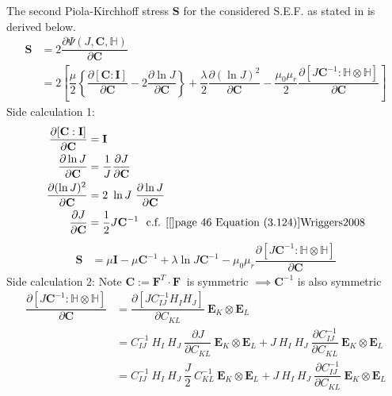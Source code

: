 \documentclass[11pt,a4paper,final]{article}
\begin{document}
The second Piola-Kirchhoff stress $\mathbf{S}$ for the considered S.E.F. as stated in  is derived below.
\begin{align*}
\mathbf{S} &= 2 \dfrac{\partial \Psi (J, \mathbf{C}, \mathbb{H})}{\partial \mathbf{C}} \\
&= 2 \left[ \dfrac{\mu}{2} \left\lbrace \dfrac{\partial [\mathbf{C} : \mathbf{I}]}{\partial \mathbf{C}} - 2 \dfrac{\partial \ln J}{\partial \mathbf{C}} \right\rbrace + \dfrac{\lambda}{2} \dfrac{\partial (\ln J)^2}{\partial \mathbf{C}} - \dfrac{\mu_0 \mu_r}{2} \dfrac{\partial [J \mathbf{C}^{-1} : \mathbb{H} \otimes \mathbb{H}]}{\partial \mathbf{C}} \right]
\end{align*}
Side calculation 1:
\begin{align*}
\dfrac{\partial [\mathbf{C} : \mathbf{I}]}{\partial \mathbf{C}} &= \mathbf{I} \\ 
\dfrac{\partial \ln J}{\partial \mathbf{C}} &= \dfrac{1}{J} \dfrac{\partial J}{\partial \mathbf{C}} \\
\dfrac{\partial (\ln J)^2}{\partial \mathbf{C}} &= 2 \ \ln J \ \dfrac{\partial \ln J}{\partial \mathbf{C}} \\
\dfrac{\partial J}{\partial \mathbf{C}} &= \dfrac{1}{2} J \mathbf{C}^{-1} \ \  \text{c.f. \cite[see][page 46 Equation (3.124)]{Wriggers2008}}
\end{align*}
\begin{align*}
\mathbf{S} &= \mu \mathbf{I} -  \mu \mathbf{C}^{-1} + \lambda \ln J \mathbf{C}^{-1} - \mu_0 \mu_r \dfrac{\partial [J \mathbf{C}^{-1} : \mathbb{H} \otimes \mathbb{H}]}{\partial \mathbf{C}}
\end{align*}
Side calculation 2: Note $\mathbf{C} := \mathbf{F}^T \cdot \mathbf{F} \ $ is symmetric $\implies \mathbf{C}^{-1}$ is also symmetric 
\begin{align*}
\dfrac{\partial [J \mathbf{C}^{-1} : \mathbb{H} \otimes \mathbb{H}]}{\partial \mathbf{C}} &= \dfrac{\partial [J C^{-1}_{IJ} H_I H_J]}{\partial C_{KL}} \ \mathbf{E}_K \otimes \mathbf{E}_L \\
&= C^{-1}_{IJ} \ H_I \ H_J \ \dfrac{\partial J}{\partial C_{KL}} \ \mathbf{E}_K \otimes \mathbf{E}_L + J \ H_I \ H_J \ \dfrac{\partial C^{-1}_{IJ}}{\partial C_{KL}} \ \mathbf{E}_K \otimes \mathbf{E}_L \\
&= C^{-1}_{IJ} \ H_I \ H_J \ \dfrac{J}{2} \ C^{-1}_{KL} \ \mathbf{E}_K \otimes \mathbf{E}_L + J \ H_I \ H_J \  \dfrac{\partial C^{-1}_{IJ}}{\partial C_{KL}} \ \mathbf{E}_K \otimes \mathbf{E}_L
\end{align*}
\end{document}
